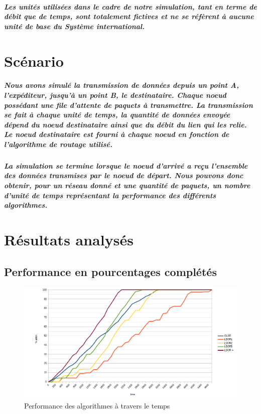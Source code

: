 \documentclass{report}
\begin{document}
\paragraph{Les unités utilisées dans le cadre de notre simulation, tant en terme de débit que de temps, sont totalement fictives et ne se réfèrent à aucune unité de base du Système international.}

\chapter{Scénario}

\paragraph{Nous avons simulé la transmission de données depuis un point A, l'expéditeur, jusqu'à un point B, le destinataire. Chaque noeud possédant une file d'attente de paquets à transmettre. La transmission se fait à chaque unité de temps, la quantité de données envoyée dépend du noeud destinataire ainsi que du débit du lien qui les relie. Le noeud destinataire est fourni à chaque noeud en fonction de l'algorithme de routage utilisé.}

\paragraph{La simulation se termine lorsque le noeud d'arrivé a reçu l'ensemble des données transmises par le noeud de départ. Nous pouvons donc obtenir, pour un réseau donné et une quantité de paquets, un nombre d'unité de temps représentant la performance des différents algorithmes.}

\chapter{Résultats analysés}

\section{Performance en pourcentages complétés}

\begin{figure}[h]
\caption{Performance des algorithmes à travers le temps}
\centering
\includegraphics[scale=0.45]{quentin_result/courbes.png}
\end{figure}
\end{document}
